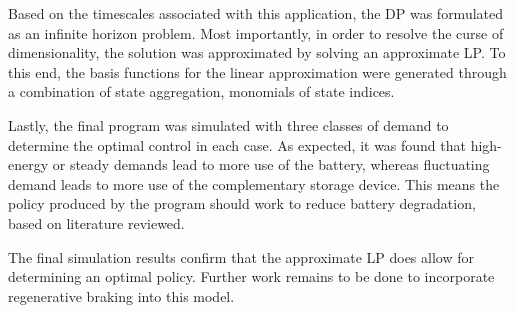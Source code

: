 \documentclass[conference]{IEEEtran}
\begin{document}
Based on the timescales associated with this application, the DP was formulated as an infinite horizon problem. Most importantly, in order to resolve the curse of dimensionality, the solution was approximated by solving an approximate LP. To this end, the basis functions for the linear approximation were generated through a combination of state aggregation, monomials of state indices.

Lastly, the final program was simulated with three classes of demand to determine the optimal control in each case. As expected, it was found that high-energy or steady demands lead to more use of the battery, whereas fluctuating demand leads to more use of the complementary storage device. This means the policy produced by the program should work to reduce battery degradation, based on literature reviewed.

The final simulation results confirm that the approximate LP does allow for determining an optimal policy. Further work remains to be done to incorporate regenerative braking into this model.

\printbibliography
\end{document}
